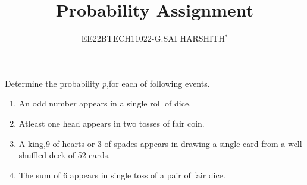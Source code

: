 \documentclass[journal,12pt,twocolumn]{IEEEtran}
\theoremstyle{remark}
\begin{document}

\vspace{3cm}

\title{Probability Assignment}
\author{EE22BTECH11022-G.SAI HARSHITH$^{*}$%
}
\maketitle
\newpage
\bigskip
\renewcommand{\thefigure}{\theenumi}
\renewcommand{\thetable}{\theenumi}

Determine the probability $p$,for each of following events.
\begin{enumerate}
\item An odd number appears in a single roll of dice.
\item Atleast one head appears in two tosses of fair coin.
\item A king,9 of hearts or 3 of spades appears in drawing a single card from a well shuffled deck of 52 cards.
\item The sum of 6 appears in single toss of a pair of fair dice.
\end{enumerate}
\solution
\end{document}
